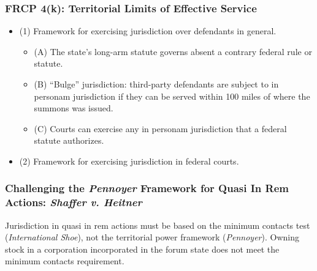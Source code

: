 \subsubsection{FRCP 4(k): Territorial Limits of Effective Service}

\begin{itemize}
    \item (1) Framework for exercising jurisdiction over defendants in 
    general.
    \begin{itemize}
        \item (A) The state's long-arm statute governs absent a contrary 
        federal rule or statute.
        \item (B) ``Bulge'' jurisdiction: third-party defendants are subject 
        to in personam jurisdiction if they can be served within 100 miles of 
        where the summons was issued.
        \item (C) Courts can exercise any in personam jurisdiction that a 
        federal statute authorizes.
    \end{itemize}
    \item (2) Framework for exercising jurisdiction in federal courts.
\end{itemize}

\subsubsection{Challenging the \emph{Pennoyer} Framework for Quasi In Rem 
Actions: \emph{Shaffer v.  Heitner}}
Jurisdiction in quasi in rem actions must be based on the minimum
contacts test (\emph{International Shoe}), not the territorial power
framework (\emph{Pennoyer}). Owning stock in a corporation incorporated in the 
forum state does not meet the minimum contacts requirement.

